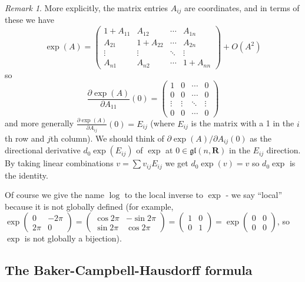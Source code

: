 \documentclass[12pt]{article}
\newcommand{\RR}{\mathbf{R}}
\newcommand{\matr}[4]{\left(\begin{array}{cc}#1 & #2\\ #3 & #4\end{array}\right)}
\theoremstyle{definition}
\theoremstyle{check}
\theoremstyle{remark}
\newtheorem{rmk}[thm]{Remark}
\theoremstyle{TheoremNum}
\begin{document}
\begin{rmk}
More explicitly, the matrix entries $A_{ij}$ are coordinates, and in terms of these we have
\[\exp(A)=\left(\begin{array}{cccc}
                     1+A_{11} & A_{12}    & \cdots & A_{1n}\\
                     A_{21}   & 1+ A_{22} & \cdots & A_{2n}\\
                     \vdots  & \vdots    & \ddots & \vdots\\
                     A_{n1}   & A_{n2}    & \cdots & 1+A_{nn}
\end{array}\right)+O(A^2)\]
so
\[\frac{\partial\exp(A)}{\partial A_{11}}(0)=\left(\begin{array}{cccc}
                     1 & 0    & \cdots & 0\\
                     0   & 0 & \cdots & 0\\
                     \vdots  & \vdots    & \ddots & \vdots\\
                     0   & 0    & \cdots & 0
\end{array}\right)\]
and more generally $\frac{\partial\exp(A)}{\partial A_{ij}}(0)=E_{ij}$ (where $E_{ij}$ is the matrix with a 1 in the $i$th row and $j$th column). We should think of $\partial\exp(A)/\partial A_{ij}(0)$ as the directional derivative $d_0\exp(E_{ij})$ of $\exp$ at $0\in\mathfrak{gl}(n,\RR)$ in the $E_{ij}$ direction. By taking linear combinations $v=\sum v_{ij}E_{ij}$ we get $d_0\exp(v)=v$ so $d_0\exp$ is the identity.
\end{rmk}

Of course we give the name $\log$ to the local inverse to $\exp$ - we say ``local'' because it is not globally defined (for example, $\exp\matr{0}{-2\pi}{2\pi}{0}=\matr{\cos 2\pi}{-\sin 2\pi}{\sin 2\pi}{\cos 2\pi}=\matr{1}{0}{0}{1}=\exp\matr{0}{0}{0}{0}$, so $\exp$ is not globally a bijection).

\subsection{The Baker-Campbell-Hausdorff formula}
\end{document}
